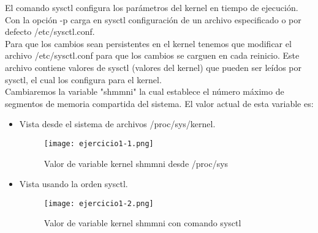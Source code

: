 	El comando sysctl configura los parámetros del kernel en tiempo de ejecución. Con la opción -p carga en sysctl configuración de un archivo especificado o por defecto /etc/sysctl.conf\cite{ejercicio1-1}.\\
	Para que los cambios sean persistentes en el kernel tenemos que modificar el archivo /etc/sysctl.conf para que los cambios se carguen en cada reinicio\cite{ejercicio1-2}. Este archivo contiene valores de sysctl (valores del kernel) que pueden ser leídos por sysctl, el cual los configura para el kernel\cite{ejercicio1-3}.\\
	
	
	Cambiaremos la variable "shmmni" la cual establece el número máximo de segmentos de memoria compartida del sistema\cite{ejercicio1-4}. El valor actual de esta variable es:
	\begin{itemize}
		\item Vista desde el sistema de archivos /proc/sys/kernel.
			 \begin{figure}[H] 
			 	\centering
			 	\texttt{[image: ejercicio1-1.png]} 
			 	\label{figura1} 
			 	\caption{Valor de variable kernel shmmni desde /proc/sys}
			 \end{figure}
		\item Vista usando la orden sysctl.
			\begin{figure}[H] 
				\centering
				\texttt{[image: ejercicio1-2.png]} 
				\label{figura2} 
				\caption{Valor de variable kernel shmmni con comando sysctl}
			\end{figure}
	\end{itemize}
	
